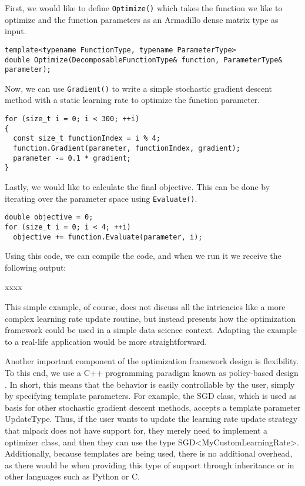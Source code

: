 \documentclass{article}
\begin{document}
First, we would like to define {\tt Optimize()} which takes the function we like
to optimize and the function parameters as an Armadillo dense matrix type as
input.

\begin{verbatim}
template<typename FunctionType, typename ParameterType>
double Optimize(DecomposableFunctionType& function, ParameterType& parameter);
\end{verbatim}

Now, we can use {\tt Gradient()} to write a simple stochastic gradient descent
method with a static learning rate to optimize the function parameter.

\begin{verbatim}
for (size_t i = 0; i < 300; ++i)
{
  const size_t functionIndex = i % 4;
  function.Gradient(parameter, functionIndex, gradient);
  parameter -= 0.1 * gradient;
}
\end{verbatim}

Lastly, we would like to calculate the final objective. This can be done by
iterating over the parameter space using {\tt Evaluate()}.

\begin{verbatim}
double objective = 0;
for (size_t i = 0; i < 4; ++i)
  objective += function.Evaluate(parameter, i);
\end{verbatim}

Using this code, we can compile the code, and when we run it we receive the
following output:

xxxx

This simple example, of course, does not discuss all the intricacies like a more
complex learning rate update routine, but instead presents how the optimization
framework could be used in a simple data science context. Adapting the example
to a real-life application would be more straightforward.


Another important component of the optimization framework design is flexibility.
To this end, we use a C++ programming paradigm known as policy-based design
\cite{Alexandrescu2001}. In short, this means that the behavior is easily
controllable by the user, simply by specifying template parameters. For example,
the SGD class, which is used as basis for other stochastic gradient descent
methods, accepts a template parameter UpdateType. Thus, if the user wants to
update the learning rate update strategy that mlpack does not have support for,
they merely need to implement a optimizer class, and then they can use the type
SGD<MyCustomLearningRate>. Additionally, because templates are being used, there
is no additional overhead, as there would be when providing this type of support
through inheritance or in other languages such as Python or C.
\end{document}
